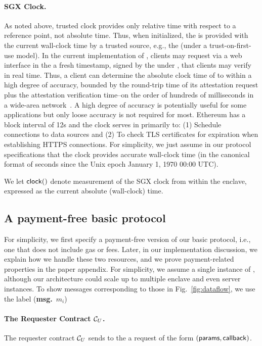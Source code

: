 \paragraph{\bf SGX Clock.}
As noted above, trusted clock provides only relative time with respect to a reference point, not absolute time. Thus, when initialized, the \encname is provided with the current wall-clock time by a trusted source, e.g., the \medname (under a trust-on-first-use model). In the current implementation of \tc, clients may request via a web interface in the \medname a fresh timestamp, signed by the \encname under \pkTC, that clients may verify in real time. Thus, a client can determine the absolute clock time of \encname to within a high degree of accuracy, bounded by the round-trip time of its attestation request plus the attestation verification time--on the order of hundreds of milliseconds in a wide-area network~\cite{}. A high degree of accuracy is potentially useful for some applications but only loose accuracy is not required for most. Ethereum has a block interval of 12s and the clock serves in \tc primarily to: (1) Schedule connections to data sources and (2) To check TLS certificates for expiration when establishing HTTPS connections. For simplicity, we just assume in our protocol specifications that the \encname clock provides accurate wall-clock time (in the canonical format of seconds since the Unix epoch January 1, 1970 00:00 UTC).

We let ${{\sf clock}}()$ denote measurement of the SGX clock from within the enclave, expressed as the current absolute (wall-clock) time. 


\subsection{A payment-free basic protocol}
\label{sec:payment-free-protocol}

For simplicity, we first specify a payment-free version of our basic protocol, i.e., one that does not include gas or fees. Later, in our implementation discussion, we explain how we handle these two resources, and we prove payment-related properties in the paper appendix. For simplicity, we assume a single instance of \engine, although our architecture could scale up to multiple enclave and even server instances. To show messages corresponding to those in Fig.~\ref{fig:dataflow}, we use the label ({\bf msg.}~$m_i$)

\paragraph{The Requester Contract ${\cal C}_U$.}
The requester contract ${\cal C}_U$ sends to the \tcontract \tcont
a request of the form $({\sf params}, {\sf callback})$.

